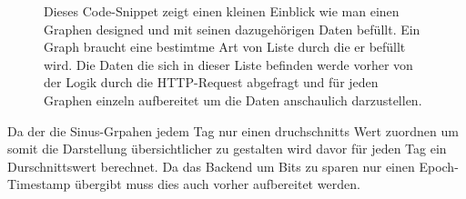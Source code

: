 \begin{figure}[h!]
\begin{minipage}[c]{0.5\textwidth}
\end{minipage}
\begin{minipage}[c]{0.5\textwidth}
    \label{fig:CodeSnippetGraph}
    Dieses Code-Snippet zeigt einen kleinen Einblick wie man einen Graphen designed und mit seinen dazugehörigen 
    Daten befüllt. Ein Graph braucht eine bestimtme Art von Liste durch die er befüllt wird. Die Daten 
    die sich in dieser Liste befinden werde vorher von der Logik durch die HTTP-Request abgefragt und für jeden Graphen einzeln
    aufbereitet um die Daten anschaulich darzustellen.
\end{minipage}
\end{figure}
\newline 
Da der die Sinus-Grpahen jedem Tag nur einen druchschnitts Wert zuordnen um somit die Darstellung übersichtlicher
zu gestalten wird davor für jeden Tag ein Durschnittswert berechnet. Da das Backend um Bits zu sparen nur einen Epoch-Timestamp übergibt
muss dies auch vorher aufbereitet werden.




